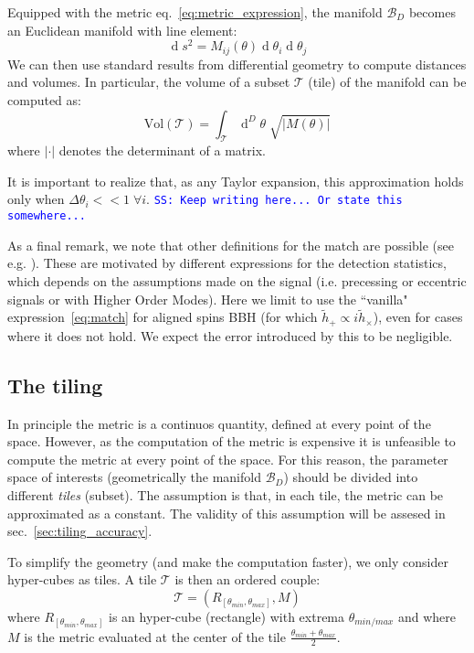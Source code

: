 \documentclass[twocolumn,showpacs,preprintnumbers,nofootinbib,prd,
superscriptaddress,10pt]{revtex4-1}
\renewcommand{\d}[1]{\ensuremath{\operatorname{d}\!{#1}}}
\renewcommand{\dvol}[2]{\ensuremath{\operatorname{d}^{#2}\!{#1}}}
\newcommand{\stefano}[1]{{\textcolor{blue}{\texttt{SS: #1}} }}
\begin{document}
Equipped with the metric eq.~\eqref{eq:metric_expression}, the manifold $\mathcal{B}_D$ becomes an Euclidean manifold with line element:
\begin{equation}\label{eq:line_element}
	\d{s^2} = M_{ij}(\theta) \d{\theta_i} \d{\theta_j}
\end{equation}
We can then use standard results from differential geometry to compute distances and volumes. In particular, the volume of a subset $\mathcal{T}$ (tile) of the manifold can be computed as:
\begin{equation}\label{eq:volume_tile}
	\text{Vol}(\mathcal{T}) = \int_\mathcal{T} \dvol{\theta}{D} \; \sqrt{|M(\theta)|}
\end{equation}
where $|\cdot|$ denotes the determinant of a matrix.

It is important to realize that, as any Taylor expansion, this approximation holds only when ${\Delta\theta_i << 1 \; \forall i}$.
\stefano{Keep writing here... Or state this somewhere...}


As a final remark, we note that other definitions for the match are possible (see e.g. \cite{sky_maxed,symphony}). These are motivated by different expressions for the detection statistics, which depends on the assumptions made on the signal (i.e. precessing or eccentric signals or with Higher Order Modes). Here we limit to use the ``vanilla" expression~\eqref{eq:match} for aligned spins BBH (for which $\tilde{h}_+ \propto i \tilde{h}_\times$), even for cases where it does not hold. We expect the error introduced by this to be negligible.

\subsection{The tiling} \label{sec:tiling}

In principle the metric is a continuos quantity, defined at every point of the space. However, as the computation of the metric is expensive it is unfeasible to compute the metric at every point of the space.
For this reason, the parameter space of interests (geometrically the manifold $\mathcal{B}_D$) should be divided into different {\it tiles} (subset). The assumption is that, in each tile, the metric can be approximated as a constant.
The validity of this assumption will be assesed in sec.~\ref{sec:tiling_accuracy}.

To simplify the geometry (and make the computation faster), we only consider hyper-cubes as tiles. A tile $\mathcal{T}$ is then an ordered couple:
\begin{equation} \label{eq:tile}
	\mathcal{T} = \left(R_{[\theta_{min}, \theta_{max}]}, M \right)
\end{equation}
where $R_{[\theta_{min}, \theta_{max}]}$ is an hyper-cube (rectangle) with extrema $\theta_{min/max}$ and where $M$ is the metric evaluated at the center of the tile $\frac{\theta_{min}+\theta_{max}}{2}$.
\end{document}
